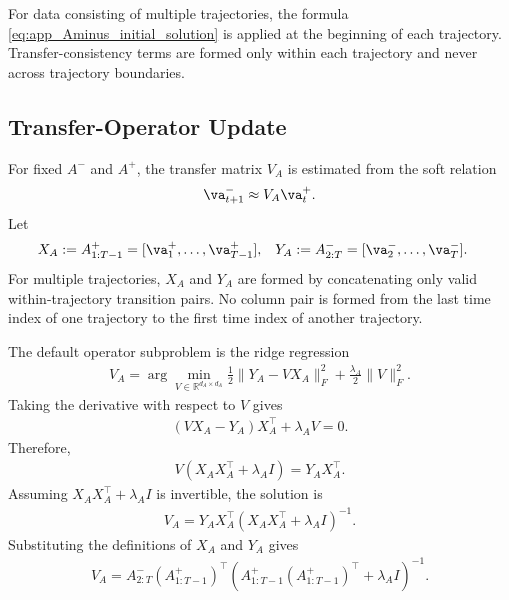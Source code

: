 \documentclass[twoside,11pt]{article}
\begin{document}
For data consisting of multiple trajectories, the formula
\eqref{eq:app_Aminus_initial_solution} is applied at the beginning of
each trajectory. Transfer-consistency terms are formed only within each
trajectory and never across trajectory boundaries.

\subsection{Transfer-Operator Update}

For fixed $A^-$ and $A^+$, the transfer matrix $V_A$ is estimated from
the soft relation
\begin{align}
\va_{t+1}^-
\approx
V_A\va_t^+.
\end{align}
Let
\begin{align}
X_A
&:=
A_{1:T-1}^+
=
[\va_1^+,\dots,\va_{T-1}^+],
&
Y_A
&:=
A_{2:T}^-
=
[\va_2^-,\dots,\va_T^-].
\label{eq:app_transfer_design_matrices}
\end{align}
For multiple trajectories, $X_A$ and $Y_A$ are formed by concatenating
only valid within-trajectory transition pairs. No column pair is formed
from the last time index of one trajectory to the first time index of
another trajectory.

The default operator subproblem is the ridge regression
\begin{align}
V_A
=
\arg\min_{V\in\mathbb R^{d_A\times d_A}}
\frac12
\|Y_A - VX_A\|_F^2
+
\frac{\lambda_A}{2}
\|V\|_F^2.
\label{eq:app_transfer_ridge_problem}
\end{align}
Taking the derivative with respect to $V$ gives
\begin{align}
(VX_A-Y_A)X_A^\top+\lambda_A V=0.
\label{eq:app_transfer_gradient}
\end{align}
Therefore,
\begin{align}
V(X_AX_A^\top+\lambda_A I)
=
Y_AX_A^\top.
\label{eq:app_transfer_normal_equation}
\end{align}
Assuming $X_AX_A^\top+\lambda_A I$ is invertible, the solution is
\begin{align}
V_A
=
Y_AX_A^\top
(X_AX_A^\top+\lambda_A I)^{-1}.
\label{eq:app_transfer_closed_form}
\end{align}
Substituting the definitions of $X_A$ and $Y_A$ gives
\begin{align}
V_A
=
A_{2:T}^-
(A_{1:T-1}^+)^\top
\left(
A_{1:T-1}^+
(A_{1:T-1}^+)^\top
+
\lambda_A I
\right)^{-1}.
\label{eq:app_VA_closed_form_final}
\end{align}
\end{document}
